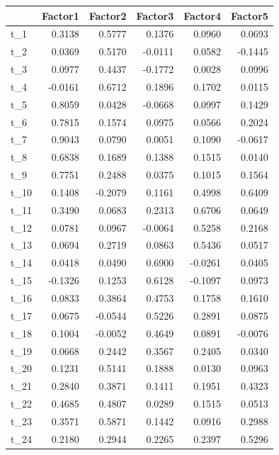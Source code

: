 \documentclass[
]{article}
\theoremstyle{plain}
\begin{document}
\begin{longtable}[]{@{}lrrrrr@{}}
\toprule\noalign{}
& Factor1 & Factor2 & Factor3 & Factor4 & Factor5 \\
\midrule\noalign{}
\endhead
\bottomrule\noalign{}
\endlastfoot
t\_1 & 0.3138 & 0.5777 & 0.1376 & 0.0960 & 0.0693 \\
t\_2 & 0.0369 & 0.5170 & -0.0111 & 0.0582 & -0.1445 \\
t\_3 & 0.0977 & 0.4437 & -0.1772 & 0.0028 & 0.0996 \\
t\_4 & -0.0161 & 0.6712 & 0.1896 & 0.1702 & 0.0115 \\
t\_5 & 0.8059 & 0.0428 & -0.0668 & 0.0997 & 0.1429 \\
t\_6 & 0.7815 & 0.1574 & 0.0975 & 0.0566 & 0.2024 \\
t\_7 & 0.9043 & 0.0790 & 0.0051 & 0.1090 & -0.0617 \\
t\_8 & 0.6838 & 0.1689 & 0.1388 & 0.1515 & 0.0140 \\
t\_9 & 0.7751 & 0.2488 & 0.0375 & 0.1015 & 0.1564 \\
t\_10 & 0.1408 & -0.2079 & 0.1161 & 0.4998 & 0.6409 \\
t\_11 & 0.3490 & 0.0683 & 0.2313 & 0.6706 & 0.0649 \\
t\_12 & 0.0781 & 0.0967 & -0.0064 & 0.5258 & 0.2168 \\
t\_13 & 0.0694 & 0.2719 & 0.0863 & 0.5436 & 0.0517 \\
t\_14 & 0.0418 & 0.0490 & 0.6900 & -0.0261 & 0.0405 \\
t\_15 & -0.1326 & 0.1253 & 0.6128 & -0.1097 & 0.0973 \\
t\_16 & 0.0833 & 0.3864 & 0.4753 & 0.1758 & 0.1610 \\
t\_17 & 0.0675 & -0.0544 & 0.5226 & 0.2891 & 0.0875 \\
t\_18 & 0.1004 & -0.0052 & 0.4649 & 0.0891 & -0.0076 \\
t\_19 & 0.0668 & 0.2442 & 0.3567 & 0.2405 & 0.0340 \\
t\_20 & 0.1231 & 0.5141 & 0.1888 & 0.0130 & 0.0963 \\
t\_21 & 0.2840 & 0.3871 & 0.1411 & 0.1951 & 0.4323 \\
t\_22 & 0.4685 & 0.4807 & 0.0289 & 0.1515 & 0.0513 \\
t\_23 & 0.3571 & 0.5871 & 0.1442 & 0.0916 & 0.2988 \\
t\_24 & 0.2180 & 0.2944 & 0.2265 & 0.2397 & 0.5296 \\
\end{longtable}
\end{document}
